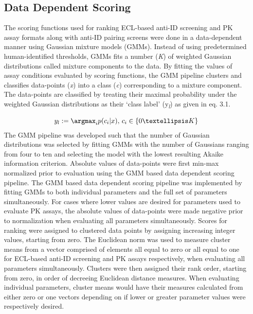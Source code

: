 \subsection{Data Dependent Scoring}
The scoring functions used for ranking ECL-based anti-ID screening and PK assay formats along with anti-ID pairing screens were done in a data-dependent manner using Gaussian mixture models (GMMs).  Instead of using predetermined human-identified thresholds, GMMs fits a number (\emph{K}) of weighted Gaussian distributions called mixture components to the data.  By fitting the values of assay conditions evaluated by scoring functions, the GMM pipeline clusters and classifies data-points (\emph{x}) into a class (\emph{c}) corresponding to a mixture component.  The data-points are classified by treating their maximal probability under the weighted Gaussian distributions as their ‘class label’ (y\textsubscript{\emph{l}}) as given in eq. 3.1. 

\begin{equation}
y_l:=\argmax_ip(c_i\vert x),\,c_i\in \{0…K\}
\end{equation}
The GMM pipeline was developed such that the number of Gaussian distributions was selected by fitting GMMs with the number of Gaussians ranging from four to ten and selecting the model with the lowest resulting Akaike information criterion.  Absolute values of data-points were first min-max normalized prior to evaluation using the GMM based data dependent scoring pipeline.  The GMM based data dependent scoring pipeline was implemented by fitting GMMs to both individual parameters and the full set of parameters simultaneously.  For cases where lower values are desired for parameters used to evaluate PK assays, the absolute values of data-points were made negative prior to normalization when evaluating all parameters simultaneously.  Scores for ranking were assigned to clustered data points by assigning increasing integer values, starting from zero.  The Euclidean norm was used to measure cluster means from a vector comprised of elements all equal to zero or all equal to one for ECL-based anti-ID screening and PK assays respectively, when evaluating all parameters simultaneously.  Clusters were then assigned their rank order, starting from zero, in order of decreeing Euclidean distance measures.  When evaluating individual parameters, cluster means would have their measures calculated from either zero or one vectors depending on if lower or greater parameter values were respectively desired.  

